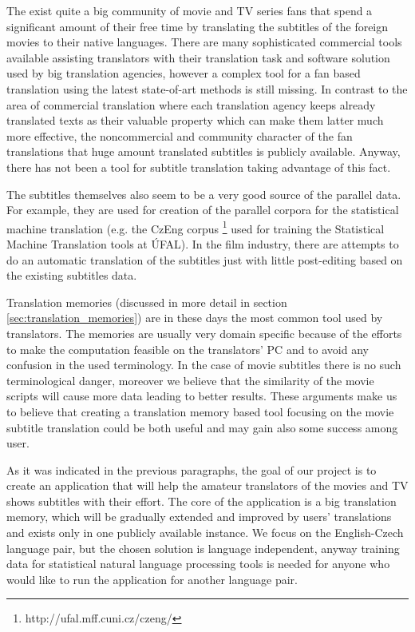 The exist quite a big community of movie and TV series fans that spend a significant amount of their free time by translating the subtitles of the foreign movies to their native languages. There are many sophisticated commercial tools available assisting translators with their translation task and software solution used by big translation agencies, however a complex tool for a fan based translation using the latest state-of-art methods is still missing. In contrast to the area of commercial translation where each translation agency keeps already translated texts as their valuable property which can make them latter much more effective, the noncommercial and community character of the fan translations that huge amount translated subtitles is publicly available. Anyway, there has not been a tool for subtitle translation taking advantage of this fact.

The subtitles themselves also seem to be a very good source of the parallel data. 
For example, they are used for creation of the parallel corpora for the statistical machine translation (e.g. the CzEng corpus \footnote{http://ufal.mff.cuni.cz/czeng/} used for training the Statistical Machine Translation tools at ÚFAL). In the film industry, there are attempts to do an automatic translation of the subtitles just with little post-editing based on the existing subtitles data.

Translation memories (discussed in more detail in section \ref{sec:translation_memories}) are in these days the most common tool used by translators. The memories are usually very domain specific because of the efforts to make the computation feasible on the translators' PC and to avoid any confusion in the used terminology. 
In the case of movie subtitles there is no such terminological danger, moreover we believe that the similarity of the movie scripts will cause more data  leading to better results. These arguments make us to believe that creating a translation memory based tool focusing on the movie subtitle translation could be both useful and may gain also some success among user.

As it was indicated in the previous paragraphs, the goal of our project is to create an application that will help the amateur translators of the movies and TV shows subtitles with their effort. The core of the application is a big translation memory, which will be gradually extended and improved by users' translations and exists only in one publicly available instance. We focus on the English-Czech language pair, but the chosen solution is language independent, anyway training data for statistical natural language processing tools is needed for anyone who would like to run the application for another language pair.

